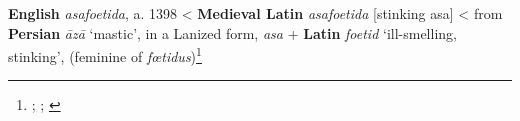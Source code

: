 \begin{etymology}\label{ety:asafoetida}
\textbf{English} \textit{asafoetida}, a. 1398
< \textbf{Medieval Latin} \textit{asafoetida} [stinking asa]
< from \textbf{Persian} \textit{āzā} `mastic', in a Lanized form, \textit{asa}
 + \textbf{Latin} \textit{foetid} `ill-smelling, stinking', (feminine of \textit{fœtidus})\footnote{\textcite[s.v. asafoetida]{oed}; \textcite[353]{laufer_sino-iranica_1919}; \textcite[42]{steingass_comprehensive_1892}}
\end{etymology}